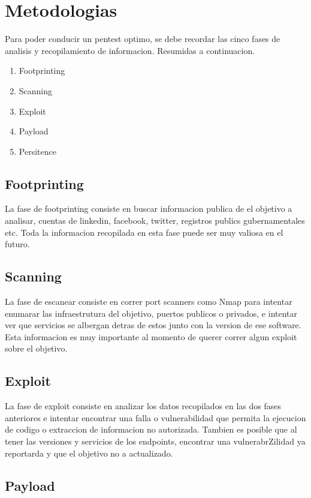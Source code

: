 \section{Metodologias}

Para poder conducir un pentest optimo, se debe recordar las cinco fases de analisis y recopilamiento de informacion. Resumidas a continuacion.

\begin{enumerate}
\item{Footprinting}
\item{Scanning}
\item{Exploit}
\item{Payload}
\item{Persitence}
\end{enumerate}

\subsection{Footprinting}
La fase de footprinting consiste en buscar informacion publica de el objetivo a analisar, cuentas de linkedin, facebook, twitter, registros publics gubernamentales etc. Toda la informacion recopilada en esta fase puede ser muy valiosa en el futuro.

\subsection{Scanning}
La fase de escanear consiste en correr port scanners como Nmap para intentar enumarar las infraestrutura del objetivo, puertos publicos o privados, e intentar ver que servicios se albergan detras de estos junto con la version de ese software. Esta informacion es muy importante al momento de querer correr algun exploit sobre el objetivo.

\subsection{Exploit}
La fase de exploit consiste en analizar los datos recopilados en las dos fases anteriores e intentar encontrar una falla o vulnerabilidad que permita la ejecucion de codigo o extraccion de informacion no autorizada. Tambien es posible que al tener las versiones y servicios de los endpoints, encontrar una vulnerabrZilidad ya reportarda y que el objetivo no a actualizado.

\subsection{Payload}

